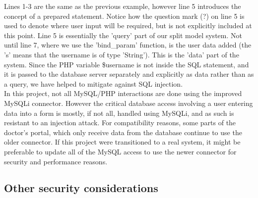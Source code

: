 \documentclass[11pt]{article}
\begin{document}
Lines 1-3 are the same as the previous example, however line 5 introduces the concept of a prepared statement. Notice how the question mark (?) on line 5 is used to denote where user input will be required, but is not explicitly included at this point. Line 5 is essentially the 'query' part of our split model system. Not until line 7, where we use the 'bind\_param' function, is the user data added (the 's' means that the username is of type 'String'). This is the 'data' part of the system. Since the PHP variable \$username is not inside the SQL statement, and it is passed to the database server separately and explicitly as data rather than as a query, we have helped to mitigate against SQL injection.
\\ \indent
In this project, not all MySQL/PHP interactions are done using the improved MySQLi connector. However the critical database access involving a user entering data into a form is mostly, if not all, handled using MySQLi, and as such is resistant to an injection attack. For compatibility reasons, some parts of the doctor's portal, which only receive data from the database continue to use the older connector. If this project were transitioned to a real system, it might be preferable to update all of the MySQL access to use the newer connector for security and performance reasons.

\subsection{Other security considerations}
\end{document}
